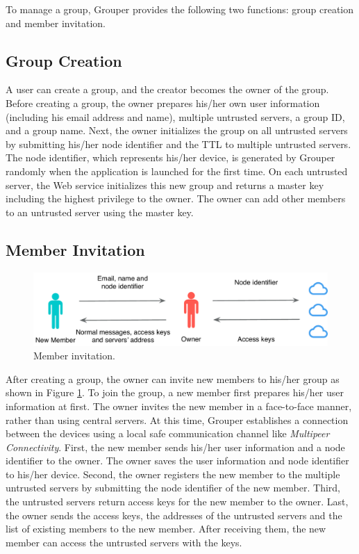 \documentclass[a4paper,11pt]{report}
\begin{document}
To manage a group, Grouper provides the following two functions: group creation and member invitation.

\subsection{Group Creation}

A user can create a group, and the creator becomes the owner of the group.  
Before creating a group, the owner prepares his/her own user information (including his email address and name), multiple untrusted servers, a group ID, and a group name. 
Next, the owner initializes the group on all untrusted servers by submitting his/her node identifier and the TTL to multiple untrusted servers. 
The node identifier, which represents his/her device, is generated by Grouper randomly when the application is launched for the first time. 
On each untrusted server, the Web service initializes this new group and returns a master key including the highest privilege to the owner. 
The owner can add other members to an untrusted server using the master key.

\subsection{Member Invitation}

\begin{figure}
	\centering
	\includegraphics[scale=0.55]{add_member}
	\caption{Member invitation.}
	\label{fig:add_member}
\end{figure}

After creating a group, the owner can invite new members to his/her group as shown in Figure \ref{fig:add_member}. 
To join the group, a new member first prepares his/her user information at first. 
The owner invites the new member in a face-to-face manner, rather than using central servers. 
At this time, Grouper establishes a connection between the devices using a local safe communication channel like \emph{Multipeer Connectivity}\cite{mc}. 
First, the new member sends his/her user information and a node identifier to the owner. 
The owner saves the user information and node identifier to his/her device. 
Second, the owner registers the new member to the multiple untrusted servers by submitting the node identifier of the new member. 
Third, the untrusted servers return access keys for the new member to the owner. 
Last, the owner sends the access keys, the addresses of the untrusted servers and the list of existing members to the new member. 
After receiving them, the new member can access the untrusted servers with the keys.
\end{document}
